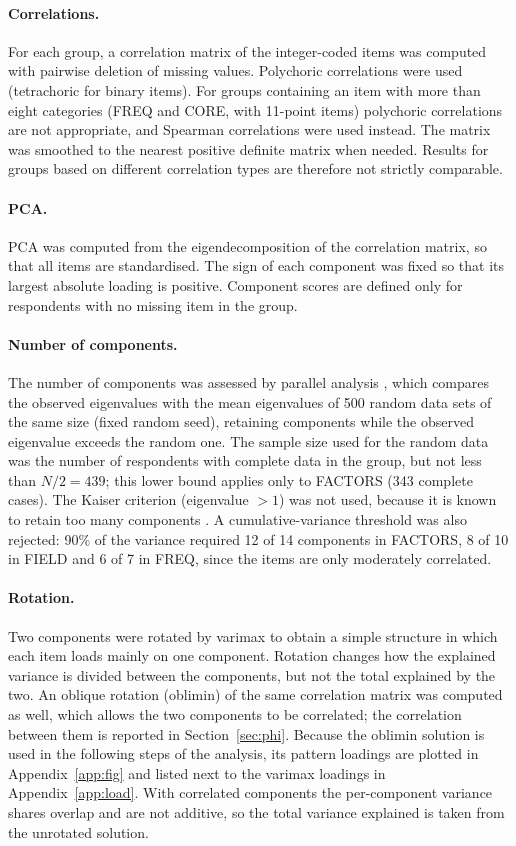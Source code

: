 \documentclass[11pt,a4paper]{article}
\begin{document}
\paragraph{Correlations.}
For each group, a correlation matrix of the integer-coded items was computed with pairwise deletion of missing values. Polychoric correlations were used (tetrachoric for binary items). For groups containing an item with more than eight categories (FREQ and CORE, with 11-point items) polychoric correlations are not appropriate, and Spearman correlations were used instead. The matrix was smoothed to the nearest positive definite matrix when needed. Results for groups based on different correlation types are therefore not strictly comparable.

\paragraph{PCA.}
PCA was computed from the eigendecomposition of the correlation matrix, so that all items are standardised. The sign of each component was fixed so that its largest absolute loading is positive. Component scores are defined only for respondents with no missing item in the group.

\paragraph{Number of components.}
The number of components was assessed by parallel analysis \citep{horn1965}, which compares the observed eigenvalues with the mean eigenvalues of 500 random data sets of the same size (fixed random seed), retaining components while the observed eigenvalue exceeds the random one. The sample size used for the random data was the number of respondents with complete data in the group, but not less than $N/2=439$; this lower bound applies only to FACTORS (343 complete cases). The Kaiser criterion (eigenvalue $>1$) was not used, because it is known to retain too many components \citep{zwick1986}. A cumulative-variance threshold was also rejected: 90\% of the variance required 12 of 14 components in FACTORS, 8 of 10 in FIELD and 6 of 7 in FREQ, since the items are only moderately correlated.

\paragraph{Rotation.}
Two components were rotated by varimax to obtain a simple structure in which each item loads mainly on one component. Rotation changes how the explained variance is divided between the components, but not the total explained by the two. An oblique rotation (oblimin) of the same correlation matrix was computed as well, which allows the two components to be correlated; the correlation between them is reported in Section~\ref{sec:phi}. Because the oblimin solution is used in the following steps of the analysis, its pattern loadings are plotted in Appendix~\ref{app:fig} and listed next to the varimax loadings in Appendix~\ref{app:load}. With correlated components the per-component variance shares overlap and are not additive, so the total variance explained is taken from the unrotated solution.
\end{document}
